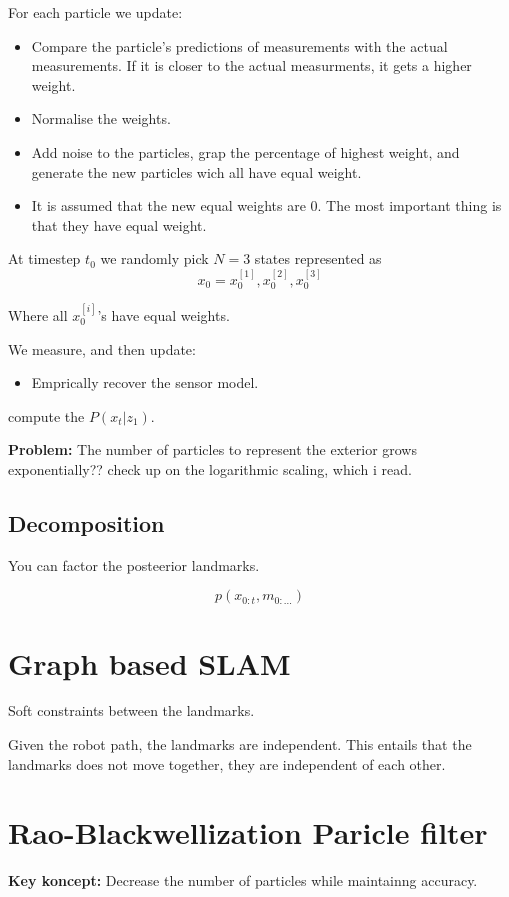 \documentclass[a4paper]{article}
\begin{document}
For each particle we update:
\begin{itemize}
	\item Compare the particle's predictions of measurements with the actual measurements. If it is closer to the actual measurments, it gets a higher weight.
	\item Normalise the weights.
	\item Add noise to the particles, grap the percentage of highest weight, and generate the new particles wich all have equal weight. 
	\item It is assumed that the new equal weights are 0. The most important thing is that they have equal weight.
\end{itemize}


At timestep $ t_0 $ we randomly pick $ N=3 $ states represented as 
 \begin{equation}
	 x_0 = {x_0^{[1]},x_0^{[2]}, x_0^{[3]}}
\end{equation}

Where all $ x_0^{[i]}$'s  have equal weights.

We measure, and then update:
\begin{itemize}
	\item Emprically recover the sensor model.
\end{itemize}

compute the $ P(x_t|z_1) $.
\vspace{5pt}

\textbf{Problem:} The number of particles to represent the exterior grows exponentially?? check up on the logarithmic scaling, which i read. 

\subsection{Decomposition}
You can factor the posteerior landmarks.

\begin{equation}
	p(x_{0:t}, m_{0:...})
\end{equation}

\section{Graph based SLAM}
Soft constraints between the landmarks.

Given the robot path, the landmarks are independent. This entails that the landmarks does not move together, they are independent of each other. 

\section{Rao-Blackwellization Paricle filter}
\textbf{Key koncept:} Decrease the number of particles while maintainng accuracy.
\end{document}

